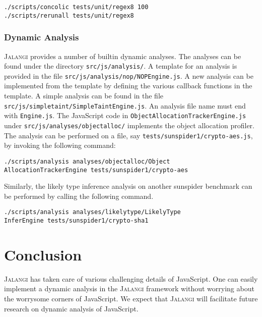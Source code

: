 \documentclass{sig-alternate}
\def\jalangi{\textsc{Jalangi}}
\begin{document}
\begin{verbatim}
./scripts/concolic tests/unit/regex8 100
./scripts/rerunall tests/unit/regex8
\end{verbatim}

\subsubsection*{Dynamic Analysis}
\label{sec:dynamic-analysis}

\jalangi{} provides a number of builtin dynamic analyses.  The
analyses can be found under the directory \texttt{src/js/analysis/}.
A template for an analysis is provided in the file
\texttt{src/js/analysis/nop/NOPEngine.js}.  A new analysis can be
implemented from the template by defining the various callback
functions in the template.  A simple analysis can be found in the file
\texttt{src/js/simpletaint/SimpleTaintEngine.js}.  An analysis file
name must end with \texttt{Engine.js}.  The JavaScript code in \texttt{ObjectAllocationTrackerEngine.js} under \texttt{src/js/analyses/objectalloc/}
implements the object allocation profiler. The analysis can be
performed on a file, say \texttt{tests/sunspider1/crypto-aes.js}, by
invoking the following command:

\begin{verbatim}
./scripts/analysis analyses/objectalloc/Object
AllocationTrackerEngine tests/sunspider1/crypto-aes
\end{verbatim}

Similarly, the likely type inference analysis on another sunspider
benchmark can be performed by calling the following command.

\begin{verbatim}
./scripts/analysis analyses/likelytype/LikelyType
InferEngine tests/sunspider1/crypto-sha1
\end{verbatim}


\section{Conclusion}
\label{sec:conclusion}

\jalangi{} has taken care of various challenging details of JavaScript.  One
can easily implement a dynamic analysis in the \jalangi{} framework
without worrying about the worrysome corners of JavaScript.  We expect that
\jalangi{} will facilitate future research on dynamic analysis of
JavaScript. 

\end{document}
